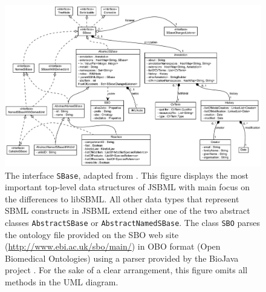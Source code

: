 \begin{figure}[htb]
 \centering
 \includegraphics[width=\textwidth]{img/SBase}
 \caption[The interface \texttt{SBase}]{The interface \texttt{SBase}, adapted
from \citet{Draeger2011}. This figure displays the most important top-level data
structures of JSBML with main focus on the differences to libSBML. All other
data types that represent SBML constructs in JSBML extend either one of the two
abstract classes \texttt{AbstractSBase} or \texttt{AbstractNamedSBase}. The
class \texttt{SBO} parses the ontology file provided on the SBO web
site (\url{http://www.ebi.ac.uk/sbo/main/}) in OBO format (Open
Biomedical Ontologies) using a parser provided by the BioJava project
\citep{Holland2008}. For the sake of a clear arrangement, this figure omits
all methods in the UML diagram.}
 \label{fig:SBase}
\end{figure}
